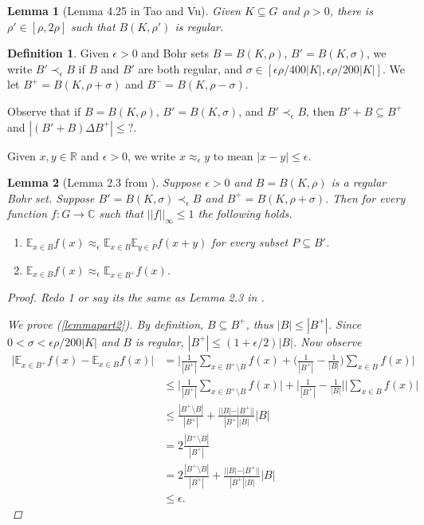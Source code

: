 \documentclass[11pt]{article}
\newtheorem{lemma}{Lemma}
\theoremstyle{definition}
\newtheorem{definition}{Definition}
\begin{document}
\begin{lemma}[Lemma 4.25 in Tao and Vu]\label{lemma2.1}
Given $K\subseteq G$ and $\rho>0$, there is $\rho'\in [\rho, 2\rho]$ such that $B(K,\rho')$ is regular.
\end{lemma}

\begin{definition}
Given $\epsilon>0$ and Bohr sets $B=B(K,\rho)$, $B'=B(K,\sigma)$, we write $B'\prec_{\epsilon}B$ if $B$ and $B'$ are both regular, and $\sigma \in [\epsilon \rho/400|K|, \epsilon \rho/200|K|]$.  We let $B^+=B(K,\rho +\sigma)$ and $B^-=B(K,\rho -\sigma)$.
\end{definition}

Observe that if $B=B(K,\rho)$, $B'=B(K,\sigma)$, and $B'\prec_{\epsilon}B$, then $B'+B\subseteq B^+$ and $|(B'+B)\Delta B^+|\leq ?$.



Given $x,y\in \mathbb{R}$ and $\epsilon>0$, we write $x\approx_{\epsilon}y$ to mean $|x-y|\leq \epsilon$.  

\begin{lemma}[Lemma 2.3 from \cite{GW2011}]
Suppose $\epsilon>0$ and $B=B(K,\rho)$ is a regular Bohr set.  Suppose $B'=B(K,\sigma)\prec_{\epsilon}B$ and $B^+=B(K,\rho+\sigma)$. Then for every function $f:G\rightarrow \mathbb{C}$ such that $||f||_{\infty}\leq 1$ the following holds.
\begin{enumerate}
\item $\mathbb{E}_{x\in B}f(x) \approx_{\epsilon} \mathbb{E}_{x\in B}\mathbb{E}_{y\in P} f(x+y)$ for every subset $P\subseteq B'$. \label{lemmapart1}
\item $\mathbb{E}_{x\in B}f(x) \approx_{\epsilon}\mathbb{E}_{x\in B^{+}}f(x)$. \label{lemmapart2}
\end{enumerate}
\begin{proof}
Redo 1 or say its the same as Lemma 2.3 in \cite{GW2011}.

We prove (\ref{lemmapart2}).  By definition, $B\subseteq B^{+}$, thus $|B|\leq |B^+|$.  Since $0<\sigma <\epsilon \rho/200|K|$ and $B$ is regular, $|B^+|\leq (1+\epsilon /2)|B|$.  Now observe
\begin{align*}
\Big|\mathbb{E}_{x\in B^+}f(x) -\mathbb{E}_{x\in B}f(x)\Big|&=\Big|\frac{1}{|B^+|}\sum_{x\in B^+\setminus B}f(x) +\Big(\frac{1}{|B^+|}-\frac{1}{|B|}\Big)\sum_{x\in B}f(x)\Big|\\
&\leq \Big|\frac{1}{|B^+|}\sum_{x\in B^+\setminus B}f(x)\Big| +\Big|\frac{1}{|B^+|}-\frac{1}{|B|}\Big|\Big|\sum_{x\in B}f(x)\Big|\\
&\leq \frac{|B^+\setminus B|}{|B^+|} +\frac{||B|-|B^+||}{|B^+||B|}|B|\\
&=2\frac{|B^+\setminus B|}{|B^+|}\\
&= 2\frac{|B^+\setminus B|}{|B^+|} +\frac{||B|-|B^+||}{|B^+||B|}|B|\\
&\leq \epsilon.
\end{align*}
\end{proof}
\end{lemma}
\end{document}
